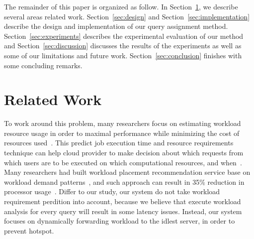 The remainder of this paper is organized as follow. In Section~\ref{sec:relWork}, we describe several areas related work. Section~\ref{sec:design} and Section~\ref{sec:implementation} describe the design and implementation of our query assignment method. Section~\ref{sec:experiments} describes the experimental evaluation of our method and Section~\ref{sec:discussion} discusses the results of the experiments as well as some of our limitations and future work. Section~\ref{sec:conclusion} finishes with some concluding remarks.

\section{Related Work}
\label{sec:relWork}

To work around this problem, many researchers focus on estimating workload resource usage in order to maximal performance while minimizing the cost of resources used~\cite{citeulike:6656217,5452742,curino2011relational, MIT-Relational}. This predict job execution time and resource requirements technique can help cloud provider to make decision about which requests from which users are to be executed on which computational resources, and when~\cite{citeulike:6656217}. Many researchers had built workload placement recommendation service base on workload demand patterns~\cite{Gmach:2007:WAD:1524302.1524818, Atikoglu:2012:WAL:2254756.2254766}, and such approach can result in 35\% reduction in processor usage~\cite{Gmach:2007:WAD:1524302.1524818}. Differ to our study, our system do not take workload requirement perdition into account, because we believe that execute workload analysis for every query will result in some latency issues. Instead, our system focuses on dynamically forwarding workload to the idlest server, in order to prevent hotspot.
 
